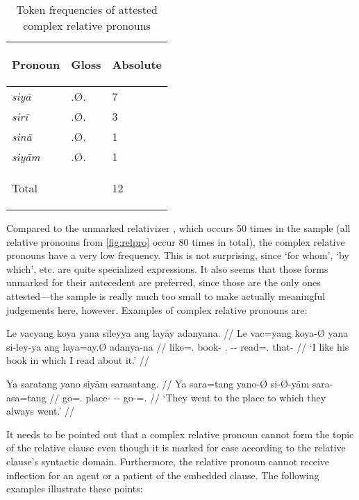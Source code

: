 \begin{table}[tp]\centering
\caption{Token frequencies of attested complex relative pronouns}

\begin{tabu} to .75
\tableheaderfont\toprule

Pronoun & Gloss & Absolute \\

\toprule

siyā	& \Rel{}.Ø.\Loc{} & 7 \\
sirī	& \Rel{}.Ø.\Ins{} & 3 \\
sinā	& \Rel{}.Ø.\Gen{} & 1 \\
siyām	& \Rel{}.Ø.\Dat{} & 1 \\

\bottomrule

\textup{Total}	& & 12 \\

\bottomrule
\end{tabu}
\label{tab:relprotokenfreq}
\end{table}

Compared to the unmarked relativizer , which occurs 50 times in 
the sample (all relative pronouns from \autoref{fig:relpro} occur 80 times in 
total), the complex relative pronouns have a very low frequency. This is not 
surprising, since `for whom', `by which', etc. are quite specialized 
expressions. It also seems that those forms unmarked for their antecedent are 
preferred, since those are the only ones attested---the sample is really much 
too small to make actually meaningful judgements here, however. Examples of 
complex relative pronouns are:

\pex
\a\begingl[glspace=.33em]
	\gla Le vacyang koya yana sileyya ang layāy adanyana. //
	\glb Le vac=yang koya-Ø yana si-ley-ya ang laya=ay.Ø adanya-na //
	\glc \PatTI{} like=\Fsg{}.\Aarg{} book-\Top{} \TsgM{}.\Gen{} 
		\Rel{}-\PargI{}-\Loc{} \Aarg{} read=\Fsg{}.\Top{} that-\Gen{} //
	\glft `I like his book in which I read about it.' //
\endgl

\a\label{ex:reldat}\begingl
	\gla Ya saratang yano siyām sarasatang. //
	\glb Ya sara=tang yano-Ø si-Ø-yām sara-asa=tang //
	\glc \LocT{} go=\TplM{}.\Aarg{} place-\Top{} \Rel{}-\Loc{}-\Dat{} 
		go-\Hab{}=\TplM{}.\Aarg{} //
	\glft `They went to the place to which they always went.' //
\endgl
\xe

It needs to be pointed out that a complex relative pronoun cannot form 
the topic of the relative clause even though it is marked for case according to 
the relative clause's syntactic domain. Furthermore, the relative pronoun 
cannot receive inflection for an agent or a patient of the embedded clause. The 
following examples illustrate these points:

